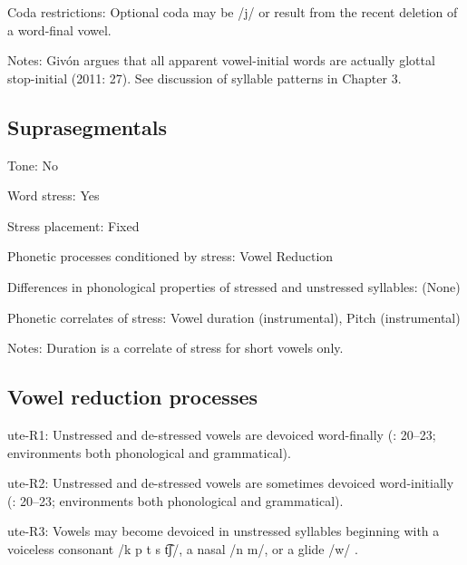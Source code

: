{\begin{appendixdesc}
\item[Coda restrictions:] Optional coda may be /j/ or result from the recent deletion of a word-final vowel. 

\item[Notes:] Givón argues that all apparent vowel-initial words are actually glottal stop-initial (2011: 27). See discussion of syllable patterns in Chapter 3.
\end{appendixdesc}
\subsection*{Suprasegmentals}
\begin{appendixdesc}
\item[Tone:] No

\item[Word stress:] Yes

\item[Stress placement:] Fixed

\item[Phonetic processes conditioned by stress:] Vowel Reduction

\item[Differences in phonological properties of stressed and unstressed syllables:] (None)

\item[Phonetic correlates of stress:] Vowel duration (instrumental), Pitch (instrumental)

\item[Notes:] Duration is a correlate of stress for short vowels only.
\end{appendixdesc}
\subsection*{Vowel reduction processes}
\begin{appendixdesc}

\item[ute-R1:] Unstressed and de-stressed vowels are devoiced word-finally (\citealt{Givón2011}: 20--23; environments both phonological and grammatical).

\item[ute-R2:] Unstressed and de-stressed vowels are sometimes devoiced word-initially (\citealt{Givón2011}: 20--23; environments both phonological and grammatical).

\item[ute-R3:] Vowels may become devoiced in unstressed syllables beginning with a voiceless consonant /k p t s t͡ʃ/, a nasal /n m/, or a glide /w/ \citep[21]{Givón2011}.
\end{appendixdesc}
}
